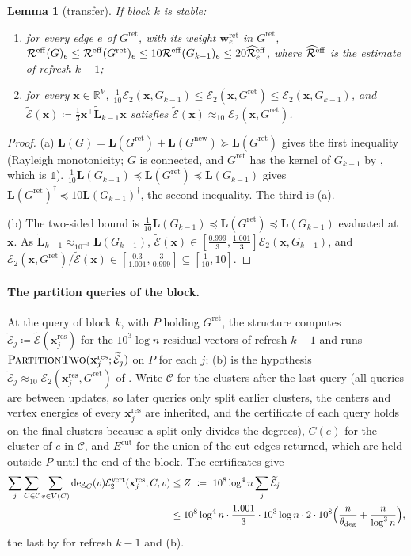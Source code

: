 \documentclass[11pt]{article}
\newtheorem{lemma}[theorem]{Lemma}
\theoremstyle{remark}
\newcommand{\LL}{\mathbf L}
\newcommand{\LLtil}{{\widetilde{\LL}}}
\newcommand{\ww}{\mathbf w}
\newcommand{\xx}{\mathbf x}
\newcommand{\xxres}{\xx^{\mathrm{res}}}
\newcommand{\dheavy}{\theta_{\deg}}
\newcommand{\Ccal}{\mathcal{C}}
\newcommand{\Ecal}[1]{\mathcal E_{#1}}
\newcommand{\Ecaltil}{\widetilde{\mathcal{E}}}
\newcommand{\Ecalvert}[1]{\mathcal{E}^{\mathrm{vert}}_{#1}}
\newcommand{\Ecut}{E^{\mathrm{cut}}}
\newcommand{\Gret}{G^{\mathrm{ret}}}
\newcommand{\Gnew}{G^{\mathrm{new}}}
\newcommand{\R}{\mathbb R}
\newcommand{\Rcal}{\mathcal{R}}
\newcommand{\Reff}{\Rcal^{\mathrm{eff}}}
\newcommand{\Reffref}{\mathrlap{\widehat{\phantom{\Rcal}\mkern4mu}}\Rcal^{\mathrm{eff}}}
\newcommand{\defeq}{\coloneqq}
\newcommand{\oone}{\mathds{1}}
\begin{document}
\begin{lemma}[transfer]\label{lem:transfer}
If block $k$ is stable:
\begin{enumerate}[label=(\alph*),leftmargin=*]
\item for every edge $e$ of $\Gret$, with its weight $\ww^{\mathrm{ret}}_e$ in
$\Gret$,
$\Reff(G)_e\le\Reff(\Gret)_e\le10\Reff(G_{k-1})_e\le20\Reffref_e$, where
$\Reffref$ is the estimate of refresh $k-1$;
\item for every $\xx\in\R^{V}$,
$\frac1{10}\Ecal2(\xx,G_{k-1})\le\Ecal2(\xx,\Gret)\le\Ecal2(\xx,G_{k-1})$, and
$\Ecaltil(\xx)\defeq\frac13\xx^{\top}\LLtil_{k-1}\xx$ satisfies
$\Ecaltil(\xx)\approx_{10}\Ecal2(\xx,\Gret)$.
\end{enumerate}
\end{lemma}
\begin{proof}
(a) $\LL(G)=\LL(\Gret)+\LL(\Gnew)\succeq\LL(\Gret)$ gives the first
inequality (Rayleigh monotonicity; $G$ is connected, and $\Gret$ has the
kernel of $G_{k-1}$ by , which is $\oone$).
$\frac1{10}\LL(G_{k-1})\preceq\LL(\Gret)\preceq\LL(G_{k-1})$ gives
$\LL(\Gret)^{\dag}\preceq10\LL(G_{k-1})^{\dag}$, the second inequality.
The third is (a).

(b) The two-sided bound is $\frac1{10}\LL(G_{k-1})\preceq\LL(\Gret)\preceq\LL(G_{k-1})$
evaluated at $\xx$.
As $\LLtil_{k-1}\approx_{10^{-3}}\LL(G_{k-1})$,
$\Ecaltil(\xx)\in[\frac{0.999}3,\frac{1.001}3]\Ecal2(\xx,G_{k-1})$, and
$\Ecal2(\xx,\Gret)/\Ecaltil(\xx)\in[\frac{0.3}{1.001},\frac{3}{0.999}]\subseteq[\frac1{10},10]$.
\end{proof}

\paragraph{The partition queries of the block.}
At the query of block $k$, with $P$ holding $\Gret$, the structure computes
$\Ecaltil_j\defeq\Ecaltil(\xxres_j)$ for the $10^{3}\log n$ residual vectors of
refresh $k-1$ and runs $\textsc{PartitionTwo}(\xxres_j;\Ecaltil_j)$ on $P$ for
each $j$; (b) is the hypothesis $\Ecaltil_j\approx_{10}\Ecal2(\xxres_j,\Gret)$
of .
Write $\Ccal$ for the clusters after the last query (all queries are between
updates, so later queries only split earlier clusters, the centers and vertex
energies of every $\xxres_j$ are inherited, and the certificate of each query
holds on the final clusters because a split only divides the degrees), $C(e)$
for the cluster of $e$ in $\Ccal$, and $\Ecut$ for the union of the cut edges
returned, which are held outside $P$ until the end of the block.
The certificates give
\begin{equation}\label{eq:Z}
\begin{aligned}
\sum_j\sum_{C\in\Ccal}\sum_{v\in V(C)}\deg_C(v)\Ecalvert2(\xxres_j,C,v)
&\le Z\ \defeq\ 10^{8}\log^{4}n\sum_j\Ecaltil_j\\
&\le 10^{8}\log^{4}n\cdot\frac{1.001}3\cdot10^{3}\log n\cdot2\cdot10^{8}\Bigl(\frac n{\dheavy}+\frac n{\log^{3}n}\Bigr),
\end{aligned}
\end{equation}
the last by  for refresh $k-1$ and (b).
\end{document}
